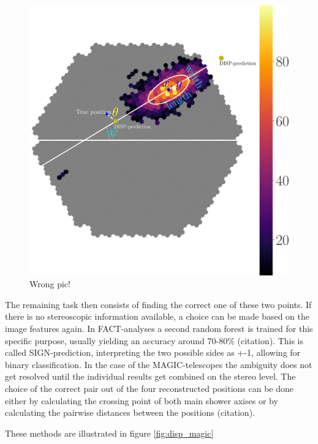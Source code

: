 \begin{figure}
    \includegraphics[width=0.9\linewidth]{Plots/hillas_complete.pdf}
    \caption{Wrong pic!}
    \label{fig:disp_amb}
\end{figure}


The remaining task then consists of finding the correct one of these
two points. If there is no stereoscopic information available,
a choice can be made based on the image features again.
In FACT-analyses a second random forest is trained for this
specific purpose, usually yielding an accuracy around 70-80\% (citation).
This is called SIGN-prediction, interpreting the two possible sides
as +-1, allowing for binary classification.
In the case of the MAGIC-telescopes the ambiguity does not
get resolved until the individual results get combined
on the stereo level. The choice of the correct
pair out of the four reconstructed positions can be done either
by calculating the crossing point of both main shower axises
or by calculating the pairwise distances between the positions (citation).


These methods are illustrated in figure \ref{fig:disp_magic}


